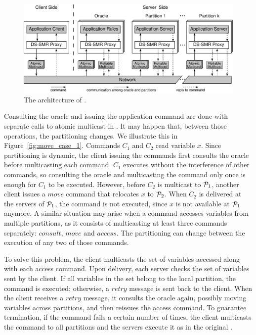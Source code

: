 \begin{figure}
\begin{minipage}[b]{1.0\linewidth} %
\centering
      \includegraphics[width=0.8\linewidth]{figures/arch}
\end{minipage}
\caption{The architecture of \dssmrlong{}.}
\label{fig:arch}
\end{figure}

Consulting the oracle and issuing the application command are done with separate calls to atomic multicast in \dssmr{}.
It may happen that, between those operations, the partitioning changes.
We illustrate this in Figure~\ref{fig:move_case_1}.
Commands $C_1$ and $C_2$ read variable $x$.
Since partitioning is dynamic, the client issuing the commands first consults the oracle before multicasting each command.
$C_1$ executes without the interference of other commands, so consulting the oracle and multicasting the command only once is enough for $C_1$ to be executed.
However, before $C_2$ is multicast to $\mathcal{P}_1$, another client issues a $move$ command that relocates $x$ to $\mathcal{P}_2$.
When $C_2$ is delivered at the servers of $\mathcal{P}_1$, the command is not executed, since $x$ is not available at $\mathcal{P}_1$ anymore.
A similar situation may arise when a command accesses variables from multiple partitions, as it consists of multicasting at least three commands separately: $consult$, $move$ and $access$.
The partitioning can change between the execution of any two of those commands.



\pagebreak
To solve this problem, the client multicasts the set of variables accessed along with each access command.
Upon delivery, each server checks the set of variables sent by the client.
If all variables in the set belong to the local partition, the command is executed; otherwise, a $retry$ message is sent back to the client.
When the client receives a $retry$ message, it consults the oracle again, possibly moving variables across partitions, and then reissues the access command.
To guarantee termination, if the command fails a certain number of times, the client multicasts the command to all partitions and the servers execute it as in the original \ssmr{}.

